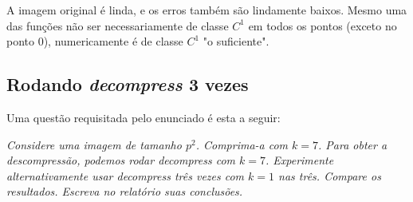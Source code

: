 \documentclass{article}
\begin{document}
A imagem original é linda, e os erros também são lindamente baixos. Mesmo uma
das funções não ser necessariamente de classe $C^1$ em todos os pontos
(exceto no ponto 0), numericamente é de classe $C^1$ "o suficiente".

\subsection{Rodando \textit{decompress} 3 vezes}

Uma questão requisitada pelo enunciado é esta a seguir:

\textit{Considere uma imagem de tamanho $p^2$. Comprima-a com $k = 7$.
Para obter a descompressão, podemos rodar decompress com $k = 7$.
Experimente alternativamente usar decompress três vezes com $k = 1$ nas
três. Compare os resultados. Escreva no relatório suas conclusões.}
\end{document}
